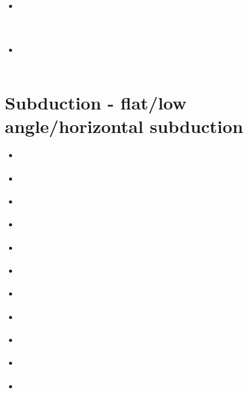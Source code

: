 \begin{scriptsize}
\begin{itemize}
\textcite{kndc21} \\ 
\textcite{roac21} \\
\textcite{vasg21} \\
\textcite{basg21} \\
\textcite{zhwa21} \\
\textcite{zhzl21} \\
\textcite{auwy21} \\
\textcite{laar21} \\
\item[\twothousandtwentytwo] 
\textcite{zhli22} \\
\textcite{auyd22} \\
\textcite{alrr22a} 
\textcite{shgv22} \\
\item[\twothousandtwentythree] 
\textcite{wulq23} \\
\textcite{zhli23} \\
\end{itemize}
\end{scriptsize}

\section{Subduction - flat/low angle/horizontal subduction}

\begin{scriptsize}
\begin{itemize}
\item[\twothousand] 
\textcite{vavv00} 
\item[\twothousandone] 
\textcite{vavv01} 
\item[\twothousandtwo] 
\textcite{vavv02} 
\textcite{vavv02b} 
\item[\twothousandfour] 
\textcite{vavv04d} 
\item[\twothousandeight] 
\textcite{pekh08} 
\textcite{esfm08} 
\item[\twothousandeleven] 
\textcite{cube11} 
\item[\twothousandtwelve] 
\textcite{mapm12} 
\textcite{ronb12} 
\item[\twothousandfifteen] 
\textcite{gehm15} 
\textcite{tarn15} 
\textcite{ealw15} 
\item[\twothousandsixteen] 
\textcite{chdf16} 
\textcite{huwc16} 
\textcite{hulh16} 
\item[\twothousandnineteen] 
\textcite{sifg19} 
\textcite{sams19b} 
\textcite{malg19} 
\item[\twothousandtwenty] 
\textcite{dawl20} 
\textcite{sche20} 
\end{itemize}
\end{scriptsize}


